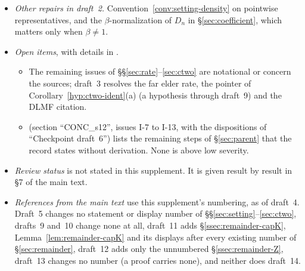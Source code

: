 \begin{itemize}[leftmargin=1.5em,itemsep=2pt]
  \begin{itemize}[leftmargin=1.2em,itemsep=1pt]
  \item Lemma~\ref{lem:parent-generic}(b), the genericity of the unpinned field, is added: the record's proof of Theorem~C uses it without proof.
  \item Two statements are worded precisely: in Lemma~\ref{lem:parent-majorant}(c) the births range over $\R$, and Lemma~\ref{lem:parent-jetrank} allows several functionals at each site.
  \item The finite algebra of \S\S\ref{sec:parent}--\ref{sec:cap} is checked by . Where the record only sketches a step, the step is given as sketched there;  lists these places.
  \item Drafts~6 and~7 write out the proofs of Lemmas~\ref{lem:parent-frame} and~\ref{lem:parent-endpoint}, the averaging formulas in the proof of Lemma~\ref{lem:parent-contact}(a), the measurability in Lemma~\ref{lem:parent-mark}(a) and the Hermite identity of Lemma~\ref{lem:cap-forced}. The identities are checked by .
  \end{itemize}
\item \emph{Other repairs in draft~2.} Convention~\ref{conv:setting-density} on pointwise representatives, and the $\beta$-normalization of $D_n$ in \S\ref{sec:coefficient}, which matters only when $\beta\ne1$.
\item \emph{Open items}, with details in .
  \begin{itemize}[leftmargin=1.2em,itemsep=1pt]
  \item The remaining issues of \S\S\ref{sec:rate}--\ref{sec:ctwo} are notational or concern the sources; draft~3 resolves the far elder rate, the pointer of Corollary~\ref{hyp:ctwo-ident}(a) (a hypothesis through draft~9) and the DLMF citation.
  \item {} (section ``CONC\_s12'', issues I-7 to I-13, with the dispositions of ``Checkpoint draft~6'') lists the remaining steps of \S\ref{sec:parent} that the record states without derivation. None is above low severity.
  \end{itemize}
\item \emph{Review status} is not stated in this supplement. It is given result by result in \S7 of the main text.
\item \emph{References from the main text} use this supplement's numbering, as of draft~4. Draft~5 changes no statement or display number of \S\S\ref{sec:setting}--\ref{sec:ctwo}, drafts~9 and~10 change none at all, draft~11 adds \S\ref{ssec:remainder-capK}, Lemma~\ref{lem:remainder-capK} and its displays after every existing number of \S\ref{sec:remainder}, draft~12 adds only the unnumbered \S\ref{ssec:remainder-Z}, draft~13 changes no number (a proof carries none), and neither does draft~14.
\end{itemize}
